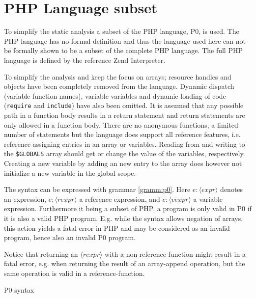 \section{PHP Language subset}
\newcommand{\syn}[1]{\langle\mathit{#1}\rangle}
\label{sec:langsubset}
To simplify the static analysis a subset of the PHP language, P0, is used. The PHP language has no formal definition and thus the language used here can not be formally shown to be a subset of the complete PHP language. The full PHP language is defined by the reference Zend Interpreter.

To simplify the analysis and keep the focus on arrays; resource handles and objects have been completely removed from the language. Dynamic dispatch (variable function names), variable variables and dynamic loading of code (\texttt{require} and \texttt{include}) have also been omitted. It is assumed that any possible path in a function body results in a return statement and return statements are only allowed in a function body. There are no anonymous functions, a limited number of statements but the language does support all reference features, i.e. reference assigning entries in an array or variables. Reading from and writing to the \texttt{\$GLOBALS} array should get or change the value of the variables, respectively. Creating a new variable by adding an new entry to the array does however not initialize a new variable in the global scope.

The syntax can be expressed with grammar \ref{gramm:p0}. Here $e : \syn{expr}$ denotes an expression, $e : \syn{rexpr}$ a reference expression, and $e : \syn{vexpr}$ a variable expression.   Furthermore it being a subset of PHP, a program is only valid in P0  if it is also a valid PHP program. E.g. while the syntax allows negation of arrays, this action yields a fatal error in PHP and may be considered as an invalid program, hence also an invalid P0 program. 

Notice that returning an $\syn{rexpr}$ with a non-reference function might result in a fatal error, e.g. when returning the result of an array-append operation, but the same operation is valid in a reference-function.  







\begin{grammarf}
\centering

\caption{P0 syntax }
\label{gramm:p0}
\end{grammarf}